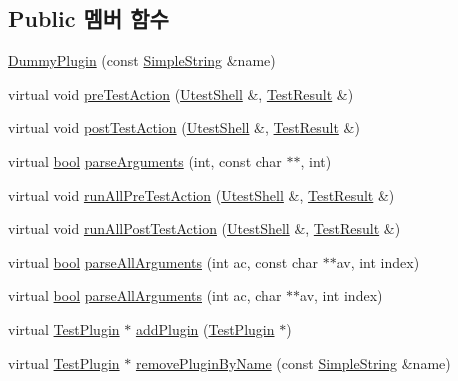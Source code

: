 \subsection*{Public 멤버 함수}
\begin{DoxyCompactItemize}
\item 
\hyperlink{class_dummy_plugin_ab2b5b2f685cd8389dd9e2704171bfb8f}{Dummy\+Plugin} (const \hyperlink{class_simple_string}{Simple\+String} \&name)
\item 
virtual void \hyperlink{class_dummy_plugin_aeb3d3b5a9cbcca6f8f4225bb29554ea2}{pre\+Test\+Action} (\hyperlink{class_utest_shell}{Utest\+Shell} \&, \hyperlink{class_test_result}{Test\+Result} \&)
\item 
virtual void \hyperlink{class_dummy_plugin_a4d9ea193c7b8e3eb8b50f985f688e4a8}{post\+Test\+Action} (\hyperlink{class_utest_shell}{Utest\+Shell} \&, \hyperlink{class_test_result}{Test\+Result} \&)
\item 
virtual \hyperlink{avb__gptp_8h_af6a258d8f3ee5206d682d799316314b1}{bool} \hyperlink{class_test_plugin_a167c2b07a0f83726bb9b1d1c0d741f88}{parse\+Arguments} (int, const char $\ast$$\ast$, int)
\item 
virtual void \hyperlink{class_test_plugin_aa3524b10b0f1613104fa75f1c1a72cf6}{run\+All\+Pre\+Test\+Action} (\hyperlink{class_utest_shell}{Utest\+Shell} \&, \hyperlink{class_test_result}{Test\+Result} \&)
\item 
virtual void \hyperlink{class_test_plugin_ac6e93f69beb5b43b8cedf17a77ccc6b1}{run\+All\+Post\+Test\+Action} (\hyperlink{class_utest_shell}{Utest\+Shell} \&, \hyperlink{class_test_result}{Test\+Result} \&)
\item 
virtual \hyperlink{avb__gptp_8h_af6a258d8f3ee5206d682d799316314b1}{bool} \hyperlink{class_test_plugin_acfa2bcea2c98a16cb7d2a8f177bb84b9}{parse\+All\+Arguments} (int ac, const char $\ast$$\ast$av, int index)
\item 
virtual \hyperlink{avb__gptp_8h_af6a258d8f3ee5206d682d799316314b1}{bool} \hyperlink{class_test_plugin_a6d3fb0408bb544bd7ec5ba9300328a5e}{parse\+All\+Arguments} (int ac, char $\ast$$\ast$av, int index)
\item 
virtual \hyperlink{class_test_plugin}{Test\+Plugin} $\ast$ \hyperlink{class_test_plugin_ac63612b566d31b52b9c09e0552f8fe9b}{add\+Plugin} (\hyperlink{class_test_plugin}{Test\+Plugin} $\ast$)
\item 
virtual \hyperlink{class_test_plugin}{Test\+Plugin} $\ast$ \hyperlink{class_test_plugin_a75abbb424eeb5b1466272ab22dd2cfcf}{remove\+Plugin\+By\+Name} (const \hyperlink{class_simple_string}{Simple\+String} \&name)
$$
\end{DoxyCompactItemize}
